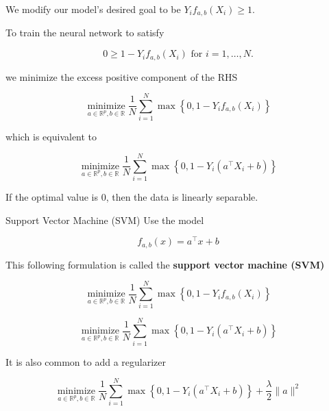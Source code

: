 \begin{frame}[allowframebreaks]
We modify our model's desired goal to be $Y_{i} f_{a, b}\left(X_{i}\right) \geq 1$.

To train the neural network to satisfy

$$
0 \geq 1-Y_{i} f_{a, b}\left(X_{i}\right) \text { for } i=1, \ldots, N .
$$

we minimize the excess positive component of the RHS

$$
\underset{a \in \mathbb{R}^{p}, b \in \mathbb{R}}{\operatorname{minimize}} \frac{1}{N} \sum_{i=1}^{N} \max \left\{0,1-Y_{i} f_{a, b}\left(X_{i}\right)\right\}
$$

which is equivalent to

$$
\underset{a \in \mathbb{R}^{p}, b \in \mathbb{R}}{\operatorname{minimize}} \frac{1}{N} \sum_{i=1}^{N} \max \left\{0,1-Y_{i}\left(a^{\top} X_{i}+b\right)\right\}
$$

If the optimal value is 0, then the data is linearly separable.

\end{frame}

\begin{frame}[allowframebreaks]

\begin{mydefinitionblock}{3.6}{Support Vector Machine (SVM)}
    Use the model

    $$
    f_{a, b}(x)=a^{\top} x+b
    $$

    This following formulation is called the \textbf{support vector machine (SVM)}

    $$
    \underset{a \in \mathbb{R}^{p}, b \in \mathbb{R}}{\operatorname{minimize}} \frac{1}{N} \sum_{i=1}^{N} \max \left\{0,1-Y_{i} f_{a, b}\left(X_{i}\right)\right\}
    $$

    $$
    \underset{a \in \mathbb{R}^{p}, b \in \mathbb{R}}{\operatorname{minimize}} \frac{1}{N} \sum_{i=1}^{N} \max \left\{0,1-Y_{i}\left(a^{\top} X_{i}+b\right)\right\}
    $$

    It is also common to add a regularizer

    $$
    \underset{a \in \mathbb{R}^{p}, b \in \mathbb{R}}{\operatorname{minimize}} \frac{1}{N} \sum_{i=1}^{N} \max \left\{0,1-Y_{i}\left(a^{\top} X_{i}+b\right)\right\}+\frac{\lambda}{2}\|a\|^{2}
    $$
\end{mydefinitionblock}

\end{frame}

